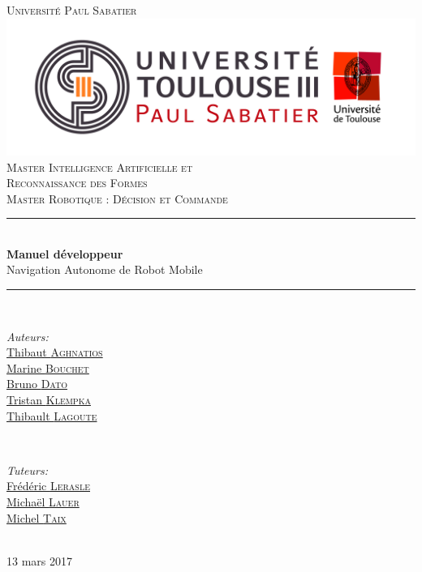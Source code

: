 \documentclass[10pt,a4paper]{article}
\begin{document}
\pagestyle {plain}

\begin{titlepage}


\newcommand{\HRule}{\rule{\linewidth}{0.5mm}} 

\center

\textsc{\Large Université Paul Sabatier}\\[1cm] 
\includegraphics[scale=0.3]{figures/UPS.jpg}\\[0.6cm] 


\textsc{Master Intelligence Artificielle et \\ 
Reconnaissance des Formes \\ Master Robotique : Décision et Commande}\\[3cm] 

\HRule \\[0.4cm]
{ \huge \bfseries Manuel développeur}\\[0.4cm] 
\LARGE Navigation Autonome de Robot Mobile

\HRule \\[1.5cm]
 

\begin{minipage}{0.4\textwidth}
\begin{flushleft} \large
\emph{Auteurs:}\\
\href{mailto:thibaut.aghnatios@laposte.net}{Thibaut \textsc{Aghnatios} }  \\
\href{mailto:bouchetmarinee@gmail.com}{Marine \textsc{Bouchet} } \\
\href{mailto:bruno.dato.meneses@gmail.com}{Bruno \textsc{Dato} } \\
\href{mailto:klempka.tristan@gmail.com}{Tristan \textsc{Klempka} } \\
\href{mailto:lagoute.31@gmail.com}{Thibault \textsc{Lagoute} }  
\end{flushleft}
\end{minipage}
~
\begin{minipage}{0.4\textwidth}
\begin{flushright} \large
\emph{Tuteurs:} \\
\href{mailto:lerasle@laas.fr}{Frédéric \textsc{Lerasle}}\\
\href{mailto:michael.lauer@laas.fr}{Michaël \textsc{Lauer}} \\
\href{mailto:taix@laas.f}{Michel \textsc{Taix}}
\end{flushright}
\end{minipage}\\[5cm]

\large 13 mars 2017
 

\end{titlepage}
\end{document}
